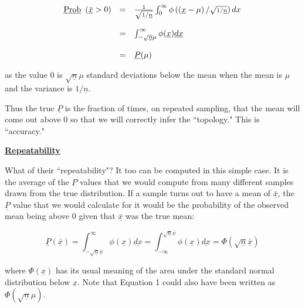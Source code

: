 {\begin{equation} %
\begin{array}{c c l}
\underline{\rm Prob}~\left(\underline{\bar x} > 0\right) & = & {1 \over \sqrt{1/\underline{n}}} \int_0^{\infty}
 \phi\left(\left(\underline{x}-\mu\right)/ {\scriptstyle \sqrt{1/\underline{n}}} \right) dx\\
& & \\
                                & = & \int_{-\sqrt{\underline{n}} \mu}^{\infty}  \phi(\underline{x})
 \underline{dx}\\
& & \\
                                 & = & \underline{P}(\mu)
\end{array}
\end{equation}
\bigskip
\bigskip


\noindent
as the value $0$ is $\sqrt{\underline{n}}\mu$ standard deviations below the mean when the
mean is $\mu$ and the variance is $1/\underline{n}$.

Thus the true $\underline{P}$ is the fraction of times, on repeated sampling, that the mean
will come out above $0$ so that we will
correctly infer the ``topology."  This is ``accuracy."

\bigskip

\centerline{\underline{\bf Repeatability}}
\bigskip


What of their ``repeatability"?  It too can be computed in this simple case.  It
is the average of the $\underline{P}$ values that we would compute from many different
samples drawn from the true distribution.  If a sample turns out to have a
mean of $\underline{\bar x}$, the $\underline{P}$ value that we would calculate for it would be
the probability of the observed mean being above $0$ given that $\underline{\bar x}$ was the
true mean:
\bigskip
\bigskip

\begin{equation} %
\underline{P}(\underline{\bar x}) =  
\int_{-\sqrt{\underline{n}} {\underline{\bar{ x}}}}^
{\infty}  \phi(\underline{x}) \underline{dx} =  
\int_{-\infty}^{\sqrt{\underline{n}} \underline{{\bar x}}}  \phi(\underline{x})
\underline{dx}  =  \Phi\left( {\sqrt{\underline{n}}
 {\bar{\underline{x}}}} \right)
\end{equation}
\bigskip
\bigskip

\noindent
where $\Phi(\underline{x})$ has its usual meaning of the area under the standard normal
 distribution below $\underline{x}$.  Note that Equation 1 could also have been written as $\Phi(\sqrt{\underline{n}}\mu)$.


}
